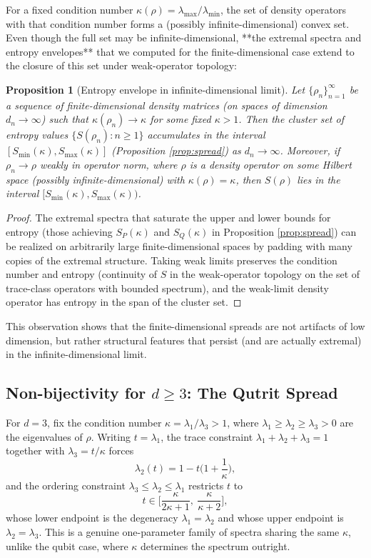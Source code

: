 \documentclass{article}
\newtheorem{proposition}[theorem]{Proposition}
\theoremstyle{remark}
\begin{document}
For a fixed condition number $\kappa(\rho)=\lambda_{\max}/\lambda_{\min}$, the set of density operators with that condition number forms a (possibly infinite-dimensional) convex set. Even though the full set may be infinite-dimensional, **the extremal spectra and entropy envelopes** that we computed for the finite-dimensional case extend to the closure of this set under weak-operator topology:

\begin{proposition}[Entropy envelope in infinite-dimensional limit]
Let $\{\rho_n\}_{n=1}^\infty$ be a sequence of finite-dimensional density matrices (on spaces of dimension $d_n\to\infty$) such that $\kappa(\rho_n)\to\kappa$ for some fixed $\kappa>1$. Then the cluster set of entropy values $\{S(\rho_n):n\ge1\}$ accumulates in the interval $[S_{\min}(\kappa),S_{\max}(\kappa)]$ (Proposition \ref{prop:spread}) as $d_n\to\infty$. Moreover, if $\rho_n\to\rho$ weakly in operator norm, where $\rho$ is a density operator on some Hilbert space (possibly infinite-dimensional) with $\kappa(\rho)=\kappa$, then $S(\rho)$ lies in the interval $[S_{\min}(\kappa),S_{\max}(\kappa))$.
\end{proposition}
\begin{proof}
The extremal spectra that saturate the upper and lower bounds for entropy (those achieving $S_P(\kappa)$ and $S_Q(\kappa)$ in Proposition \ref{prop:spread}) can be realized on arbitrarily large finite-dimensional spaces by padding with many copies of the extremal structure. Taking weak limits preserves the condition number and entropy (continuity of $S$ in the weak-operator topology on the set of trace-class operators with bounded spectrum), and the weak-limit density operator has entropy in the span of the cluster set.
\end{proof}

This observation shows that the finite-dimensional spreads are not artifacts of low dimension, but rather structural features that persist (and are actually extremal) in the infinite-dimensional limit.

\subsection{Non-bijectivity for $d\ge3$: The Qutrit Spread}\label{sec:nonbij}

For $d=3$, fix the condition number $\kappa=\lambda_1/\lambda_3>1$, where $\lambda_1\ge\lambda_2\ge\lambda_3>0$ are the eigenvalues of $\rho$. Writing $t=\lambda_1$, the trace constraint $\lambda_1+\lambda_2+\lambda_3=1$ together with $\lambda_3=t/\kappa$ forces
\[
\lambda_2(t) = 1-t\Big(1+\frac1\kappa\Big),
\]
and the ordering constraint $\lambda_3\le\lambda_2\le\lambda_1$ restricts $t$ to
\[
t \in \Big[\frac{\kappa}{2\kappa+1},\ \frac{\kappa}{\kappa+2}\Big],
\]
whose lower endpoint is the degeneracy $\lambda_1=\lambda_2$ and whose upper endpoint is $\lambda_2=\lambda_3$. This is a genuine one-parameter family of spectra sharing the same $\kappa$, unlike the qubit case, where $\kappa$ determines the spectrum outright.
\end{document}

